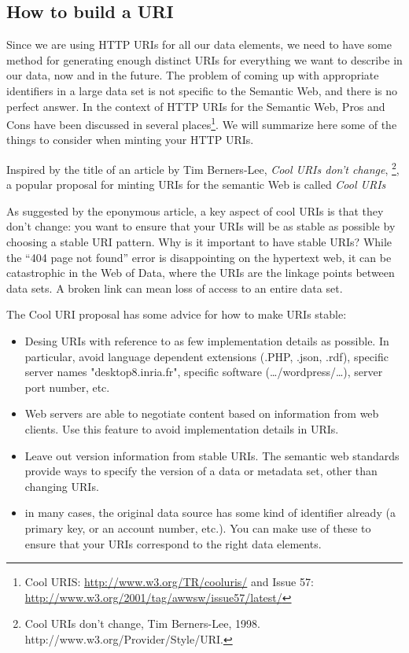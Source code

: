 \subsection{How to build a URI}

Since we are using HTTP URIs for all our data elements, we need to have some 
method for generating enough distinct URIs for everything we want to describe in our data, now and in the future.
The problem of coming up with appropriate identifiers in a large data set is not 
specific to the Semantic Web, and there is no perfect answer. In the context of HTTP URIs for the Semantic Web,
Pros
and Cons have been discussed in several places\footnote{Cool URIS:
  \url{http://www.w3.org/TR/cooluris/} and Issue 57:
  \url{http://www.w3.org/2001/tag/awwsw/issue57/latest/}}.  We will
summarize here some of the things to consider when minting your HTTP
URIs. 


Inspired by the title of an article by Tim Berners-Lee, \emph{Cool URIs don't change}, \footnote{Cool URIs don't change, Tim Berners-Lee, 1998.  http://www.w3.org/Provider/Style/URI.}, a popular proposal for 
minting URIs for the semantic Web is called \emph{Cool URIs}

As suggested by the eponymous article, a key aspect of cool URIs is that they don't change: you want to ensure
that your URIs will be as stable as possible by choosing a stable URI pattern. 
Why is it important to have stable URIs?  
While the ``404 page not found'' error is disappointing on the hypertext web, it can be catastrophic in the Web of Data, where the URIs are the
linkage points between data sets.  A broken link can mean loss of access to an entire data set.

The Cool URI proposal has some advice for how to make URIs stable:

\begin{itemize}
    \item Desing URIs with reference to as few implementation details as possible. In particular, avoid language dependent extensions (.PHP, .json, .rdf), specific server names "desktop8.inria.fr", specific software (\ldots{}/wordpress/\ldots{}), server port number, etc.  
    \item Web servers are able to negotiate content based on information from web clients. Use this feature to avoid implementation details in URIs.
    \item Leave out version information from stable URIs.  The semantic web standards provide ways to specify the version of a data or metadata set, other than changing URIs. 
    \item in many cases, the original data source has some kind of identifier already (a primary key, or an account number, etc.).  You can make use of these to ensure that your URIs correspond to the right data elements. 
\end{itemize}



